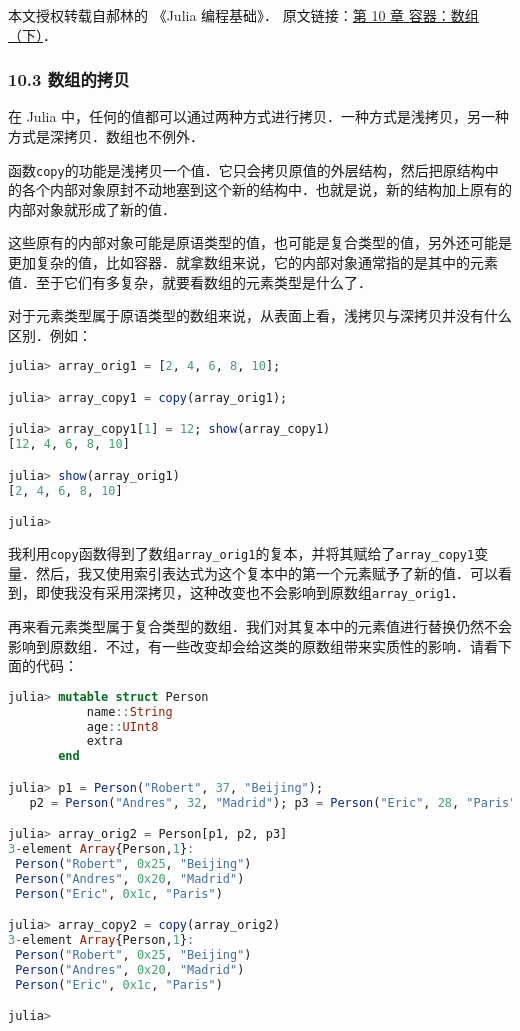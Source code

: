 
本文授权转载自郝林的 《Julia 编程基础》． 原文链接：\href{https://github.com/hyper0x/JuliaBasics/blob/master/book/ch10.md}{第 10 章 容器：数组（下）}．


\subsubsection{10.3 数组的拷贝}

在 Julia 中，任何的值都可以通过两种方式进行拷贝．一种方式是浅拷贝，另一种方式是深拷贝．数组也不例外．

函数\verb|copy|的功能是浅拷贝一个值．它只会拷贝原值的外层结构，然后把原结构中的各个内部对象原封不动地塞到这个新的结构中．也就是说，新的结构加上原有的内部对象就形成了新的值．

这些原有的内部对象可能是原语类型的值，也可能是复合类型的值，另外还可能是更加复杂的值，比如容器．就拿数组来说，它的内部对象通常指的是其中的元素值．至于它们有多复杂，就要看数组的元素类型是什么了．

对于元素类型属于原语类型的数组来说，从表面上看，浅拷贝与深拷贝并没有什么区别．例如：

\begin{lstlisting}[language=julia]
julia> array_orig1 = [2, 4, 6, 8, 10];

julia> array_copy1 = copy(array_orig1);

julia> array_copy1[1] = 12; show(array_copy1)
[12, 4, 6, 8, 10]

julia> show(array_orig1)
[2, 4, 6, 8, 10]

julia> 
\end{lstlisting}

我利用\verb|copy|函数得到了数组\verb|array_orig1|的复本，并将其赋给了\verb|array_copy1|变量．然后，我又使用索引表达式为这个复本中的第一个元素赋予了新的值．可以看到，即使我没有采用深拷贝，这种改变也不会影响到原数组\verb|array_orig1|．

再来看元素类型属于复合类型的数组．我们对其复本中的元素值进行替换仍然不会影响到原数组．不过，有一些改变却会给这类的原数组带来实质性的影响．请看下面的代码：

\begin{lstlisting}[language=julia]
julia> mutable struct Person
           name::String
           age::UInt8
           extra
       end

julia> p1 = Person("Robert", 37, "Beijing");
   p2 = Person("Andres", 32, "Madrid"); p3 = Person("Eric", 28, "Paris");

julia> array_orig2 = Person[p1, p2, p3]
3-element Array{Person,1}:
 Person("Robert", 0x25, "Beijing")
 Person("Andres", 0x20, "Madrid") 
 Person("Eric", 0x1c, "Paris")    

julia> array_copy2 = copy(array_orig2)
3-element Array{Person,1}:
 Person("Robert", 0x25, "Beijing")
 Person("Andres", 0x20, "Madrid") 
 Person("Eric", 0x1c, "Paris")    

julia> 
\end{lstlisting}

